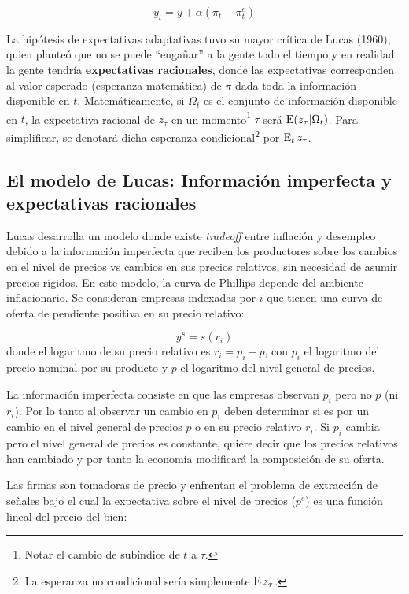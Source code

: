 \documentclass[DeGregorioResumen]{subfiles}
\begin{document}
\begin{equation}
	y_t=\overline y + \alpha(\pi_t-\pi^e_t)
	\label{eq:21-phillips_expectativas_adaptativas}
\end{equation}

La hipótesis de expectativas adaptativas tuvo su mayor crítica de Lucas (1960), quien planteó que no se puede ``engañar'' a la gente todo el tiempo y en realidad la gente tendría \textbf{expectativas racionales}, donde las expectativas corresponden al valor esperado (esperanza matemática) de $\pi$ dada toda la información disponible en $t$. Matemáticamente, si $\Omega_t$ es el conjunto de información disponible en $t$, la expectativa racional de $z_\tau$ en un momento\footnote{Notar el cambio de subíndice de $t$ a $\tau$.} $\tau$ será $\operatorname{E}(z_\tau | \Omega_t)$. Para simplificar, se denotará dicha esperanza condicional\footnote{La esperanza no condicional sería simplemente $\operatorname{E} z_\tau$.} por $\operatorname{E}_tz_\tau$.

\subsection{El modelo de Lucas: Información imperfecta y expectativas racionales}

Lucas desarrolla un modelo donde existe \textit{tradeoff} entre inflación y desempleo debido a la información imperfecta que reciben los productores sobre los cambios en el nivel de precios vs cambios en sus precios relativos, sin necesidad de asumir precios rígidos. En este modelo, la curva de Phillips depende del ambiente inflacionario. Se consideran empresas indexadas por $i$ que tienen una curva de oferta de pendiente positiva en su precio relativo:

\begin{equation}
	y^s=s(r_i)
\end{equation}
donde el logaritmo de su precio relativo es $r_i=p_i-p$, con $p_i$ el logaritmo del precio nominal por su producto y $p$ el logaritmo del nivel general de precios.

La información imperfecta consiste en que las empresas observan $p_i$ pero no $p$ (ni $r_i$). Por lo tanto al observar un cambio en $p_i$ deben determinar si es por un cambio en el nivel general de precios $p$ o en su precio relativo $r_i$. Si $p_i$ cambia pero el nivel general de precios es constante, quiere decir que los precios relativos han cambiado y por tanto la economía modificará la composición de su oferta.

Las firmas son tomadoras de precio y enfrentan el problema de extracción de señales bajo el cual la expectativa sobre el nivel de precios ($p^e$) es una función lineal del precio del bien:
\end{document}
